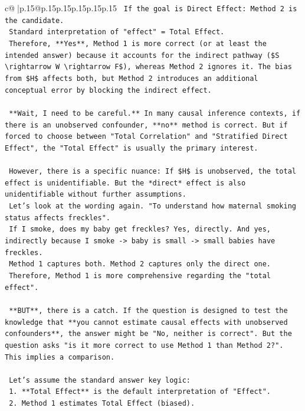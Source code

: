 \documentclass{article}
\begin{document}
{\begin{supertabular}{c@{$\;$}|p{.15\linewidth}@{}p{.15\linewidth}p{.15\linewidth}p{.15\linewidth}p{.15\linewidth}p{.15\linewidth}}
{{{\texttt{    If the goal is Direct Effect: Method 2 is the candidate.} \\
\texttt{    Standard interpretation of "effect" = Total Effect.} \\
\texttt{    Therefore, **Yes**, Method 1 is more correct (or at least the intended answer) because it accounts for the indirect pathway (\$S \textbackslash{}rightarrow W \textbackslash{}rightarrow F\$), whereas Method 2 ignores it. The bias from \$H\$ affects both, but Method 2 introduces an additional conceptual error by blocking the indirect effect.} \\
\\ 
\texttt{    **Wait, I need to be careful.** In many causal inference contexts, if there is an unobserved confounder, **no** method is correct. But if forced to choose between "Total Correlation" and "Stratified Direct Effect", the "Total Effect" is usually the primary interest.} \\
\\ 
\texttt{    However, there is a specific nuance: If \$H\$ is unobserved, the total effect is unidentifiable. But the *direct* effect is also unidentifiable without further assumptions.} \\
\texttt{    Let's look at the wording again. "To understand how maternal smoking status affects freckles".} \\
\texttt{    If I smoke, does my baby get freckles? Yes, directly. And yes, indirectly because I smoke {-}> baby is small {-}> small babies have freckles.} \\
\texttt{    Method 1 captures both. Method 2 captures only the direct one.} \\
\texttt{    Therefore, Method 1 is more comprehensive regarding the "total effect".} \\
\\ 
\texttt{    **BUT**, there is a catch. If the question is designed to test the knowledge that **you cannot estimate causal effects with unobserved confounders**, the answer might be "No, neither is correct". But the question asks "is it more correct to use Method 1 than Method 2?". This implies a comparison.} \\
\\ 
\texttt{    Let's assume the standard answer key logic:} \\
\texttt{    1.  **Total Effect** is the default interpretation of "Effect".} \\
\texttt{    2.  Method 1 estimates Total Effect (biased).} \\
}}}
\end{supertabular}}
\end{document}
